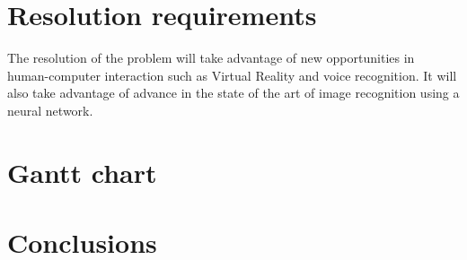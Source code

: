\documentclass[11pt,a4paper]{article}
\begin{document}
\section{Resolution requirements}

The resolution of the problem will take advantage of new opportunities in human-computer interaction such as Virtual Reality and voice recognition. It will also take advantage of advance in the state of the art of image recognition using a neural network.

\section{Gantt chart}

\section{Conclusions}
\end{document}
